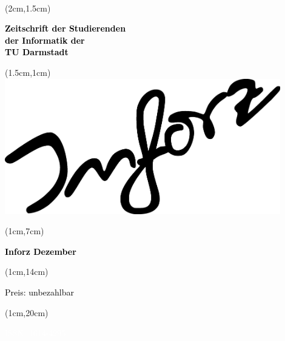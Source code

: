 \begin{titlepage}~


\begin{textblock*}{12cm}(2cm,1.5cm)
\begin{flushleft}
\large\sffamily\textbf{
\newline
\textcolor{black}{Zeitschrift der Studierenden\\ 
der Informatik der \\
TU Darmstadt} } 
\end{flushleft}
\end{textblock*}


\begin{textblock*}{12cm}(1.5cm,1cm)
\includegraphics[width=12cm]{grafik/inforz}
\end{textblock*}


\begin{textblock*}{5cm}(1cm,7cm)
\begin{rotate}{90}
\sffamily\huge\textbf{
	\textcolor{black}{Inforz Dezember \the\year}}
\end{rotate}
\end{textblock*}


\begin{textblock*}{2cm}(1cm,14cm)
\begin{rotate}{90}
\textcolor{black}{\sffamily\small Preis: unbezahlbar}
\end{rotate}
\end{textblock*}


\begin{textblock*}{2cm}(1cm,20cm)
\begin{rotate}{90}
\textcolor{white}{\sffamily ISSN: 1614-4295}
\end{rotate}
\end{textblock*}

\end{titlepage}
\newpage

